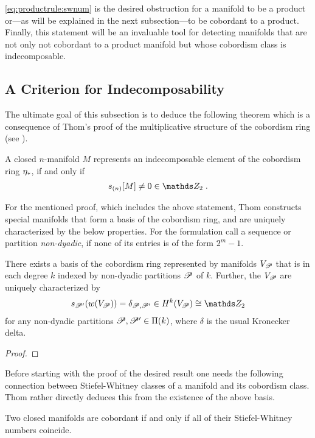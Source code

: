 \autoref{eq:productrule:swnum} is the desired obstruction for
a manifold to be a product or---as will be explained in the next
subsection---to be cobordant to a product.
Finally, this statement will be an invaluable tool for detecting
manifolds that are not only not cobordant to a product manifold but
whose cobordism class is indecomposable.


\subsection{A Criterion for Indecomposability}
The ultimate goal of this subsection is to deduce the following
theorem which is a consequence of Thom's proof of the multiplicative
structure of the cobordism ring (see \cite[Section~IV.5]{thom}).
\begin{Thm}\label{thm:indecomposabilitycriterion}
  A closed $n$-manifold $M$ represents an indecomposable element of
  the cobordism ring $\eta_*$, if and only if
  \begin{gather*}
    \snum{(n)}{M} \neq 0 \in \Zmod2
    \;.
  \end{gather*}
\end{Thm}

For the mentioned proof, which includes the above statement, Thom
constructs special manifolds that form a basis of the cobordism ring,
and are uniquely characterized by the below properties.
For the formulation call a sequence or partition \emph{non-dyadic}, if
none of its entries is of the form $2^m-1$. 
\begin{Thm}\label{thm:basiscobordismring} %
  There exists a basis of the cobordism ring represented by manifolds
  $V_{\mathscr{P}}$ that is in each degree $k$ indexed by non-dyadic
  partitions $\mathscr{P}$ of $k$. Further, the $V_{\mathscr{P}}$ are uniquely
  characterized by
  \begin{gather*}
    \s{\Part'}(\W{V_\Part}) = \delta_{\Part,\Part'}
    \in \H^k(V_{\Part})\cong \Zmod2
  \end{gather*}
  for any non-dyadic partitions $\mathscr{P},\mathscr{P}'\in\Pi({k})$,
  where $\delta$ is the usual Kronecker delta.
  \begin{proof}
  \end{proof}
\end{Thm}

Before starting with the proof of the desired result one needs the
following connection between Stiefel-Whitney classes of a manifold and
its cobordism class. Thom rather directly deduces this from the
existence of the above basis.
\begin{Thm}[Thom]\label{thm:cobordantiffswnumscoincide}
  Two closed manifolds are cobordant if and only if all of their
  Stiefel-Whitney numbers coincide.
\end{Thm}

